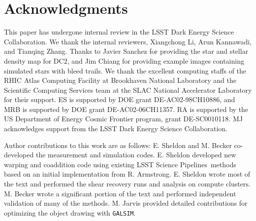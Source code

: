 \documentclass[twocolumn,twocolappendix,astrosym]{openjournal}
\newcommand{\galsim}{\texttt{GALSIM}}
\newcommand{\dm}{LSST Science Pipelines}
\begin{document}
\section*{Acknowledgments}

This paper has undergone internal review in the LSST Dark Energy Science
Collaboration.  We thank the internal reviewers, Xiangchong Li, Arun Kannawadi,
and Tianqing Zhang.  Thanks to Javier Sanchez for providing the star and
stellar density map for DC2, and Jim Chiang for providing example images
containing simulated stars with bleed trails.  We thank the excellent computing
staffs of the RHIC Atlas Computing Facility at Brookhaven National Laboratory
and the Scientific Computing Services team at the SLAC National Accelerator
Laboratory for their support.  ES is supported by DOE grant DE-AC02-98CH10886,
and MRB is supported by DOE grant DE-AC02-06CH11357. RA is supported by the US
Department of Energy Cosmic Frontier program, grant DE-SC0010118.  MJ
acknowledges support from the LSST Dark Energy Science Collaboration.

Author contributions to this work are as follows:  E. Sheldon and M. Becker
co-developed the measurement and simulation codes. E. Sheldon developed new
warping and coaddition code using existing \dm\ methods based on an initial
implementation from R. Armstrong. E. Sheldon wrote most of the text and
performed the shear recovery runs and analysis on compute clusters.  M. Becker
wrote a significant portion of the text and performed independent validation of
many of the methods.  M. Jarvis provided detailed contributions for optimizing
the object drawing with \galsim.




%
%
%
%


\end{document}
